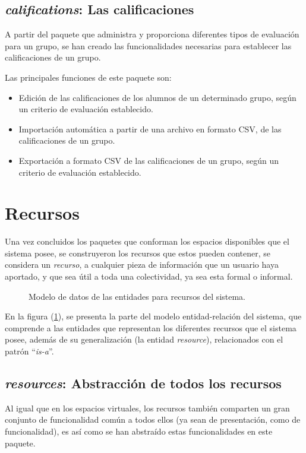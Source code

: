 \subsection{\emph{califications}: Las calificaciones}
A partir del paquete que administra y proporciona diferentes tipos de evaluación
para un grupo, se han creado las funcionalidades necesarias para establecer las
calificaciones de un grupo.

Las principales funciones de este paquete son:

\begin{itemize}
\item Edición de las calificaciones de los alumnos de un determinado grupo,
según un criterio de evaluación establecido.
\item Importación automática a partir de una archivo en formato CSV, de las
calificaciones de un grupo.
\item Exportación a formato CSV de las calificaciones de un grupo, según un
criterio de evaluación establecido.
\end{itemize}

\section{Recursos}
Una vez concluidos los paquetes que conforman los espacios disponibles que el
sistema posee, se construyeron los recursos que estos pueden contener, se
considera un \emph{recurso}, a cualquier pieza de información que un usuario
haya aportado, y que sea útil a toda una colectividad, ya sea esta formal o
informal.

\begin{figure}
\centering

\caption{Modelo de datos de las entidades para recursos del sistema.}
\label{modelo4}
\end{figure}

En la figura (\ref{modelo4}), se presenta la parte del modelo entidad-relación
del sistema, que comprende a las entidades que representan los diferentes
recursos que el sistema posee, además de su generalización (la entidad
\emph{resource}), relacionados con el patrón ``\emph{is-a}''.

\subsection{\emph{resources}: Abstracción de todos los recursos}
Al igual que en los espacios virtuales, los recursos también comparten un gran
conjunto de funcionalidad común a todos ellos (ya sean de presentación, como de
funcionalidad), es así como se han abstraído estas funcionalidades en este
paquete.

